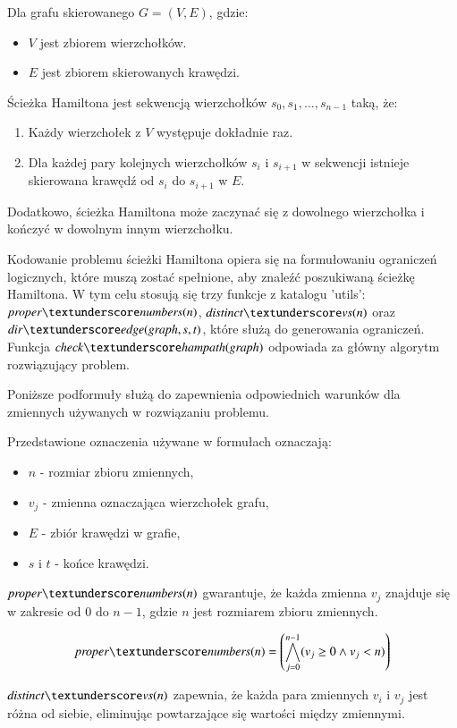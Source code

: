 Dla grafu skierowanego $G = (V, E)$, gdzie:
\begin{itemize}
	\item \(V\) jest zbiorem wierzchołków.
	\item \(E\) jest zbiorem skierowanych krawędzi.
\end{itemize}
Ścieżka Hamiltona jest sekwencją wierzchołków $s_0, s_1, …, s_{n-1}$ taką, że:
\begin{enumerate}
	\item Każdy wierzchołek z \(V\) występuje dokładnie raz.
	\item Dla każdej pary kolejnych wierzchołków \(s_i\) i \(s_{i+1}\) w sekwencji istnieje skierowana krawędź od \(s_i\) do \(s_{i+1}\) w \(E\). 
\end{enumerate}

Dodatkowo, ścieżka Hamiltona może zaczynać się z dowolnego wierzchołka i kończyć w dowolnym innym wierzchołku.

Kodowanie problemu ścieżki Hamiltona opiera się na formułowaniu ograniczeń logicznych, które muszą zostać spełnione, aby znaleźć poszukiwaną ścieżkę Hamiltona. W tym celu stosują się trzy funkcje z katalogu 'utils': $\propernumbers$, $\distinctvs$ oraz $\diredge$, które służą do generowania ograniczeń. Funkcja $\checkhampath$ odpowiada za główny algorytm rozwiązujący problem.

Poniższe podformuły służą do zapewnienia odpowiednich warunków dla zmiennych używanych w rozwiązaniu problemu.

Przedstawione oznaczenia używane w formułach oznaczają:
\begin{itemize}
	\item \(n\) - rozmiar zbioru zmiennych, 
	\item \(v_j\) - zmienna oznaczająca wierzchołek grafu,
	\item \(E\) - zbiór krawędzi w grafie,
	\item \(s\) i \(t\) - końce krawędzi.
\end{itemize}

$\propernumbers$ gwarantuje, że każda zmienna \(v_j\) znajduje się w zakresie od \(0\) do $n − 1$, gdzie \(n\) jest rozmiarem zbioru zmiennych.

\begin{align*}
	\propernumbers = \left( \bigwedge_{j=0}^{n-1} (v_j \geq 0 \land v_j < n) \right) 
\end{align*}

$\distinctvs$ zapewnia, że każda para zmiennych \(v_i\) i \(v_j\) jest różna od siebie, eliminując powtarzające się wartości między zmiennymi.

